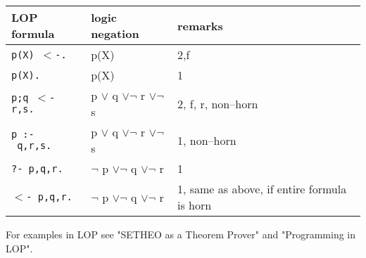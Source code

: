\begin{center}
\begin{tabular}{|l|l|l|}
\hline
LOP formula & logic negation & remarks \\
\hline
\hline
{\tt p(X) $<$-.} & p(X) & 2,f \\
\hline
{\tt p(X).} & p(X) & 1 \\
\hline
{\tt p;q $<$- r,s.} &
 p $\vee$ q $\vee \neg$ r $\vee \neg$ s 
& 2, f, r, non--horn \\
\hline
{\tt p :- ~q,r,s.} & p $\vee$ q $\vee \neg$ r $\vee \neg$ s &
1, non--horn \\ 
\hline
{\tt ?- p,q,r.} &
 $\neg$ p $\vee \neg$ q $\vee \neg$ r 
& 1 \\
\hline
{\tt $<$- p,q,r.} &
 $\neg$ p $\vee \neg$ q $\vee \neg$ r 
& 1, same as above, if entire formula is horn \\
\hline
\end{tabular}
\end{center}
\vspace{8mm}

For examples in LOP see "SETHEO as a Theorem Prover" and "Programming in LOP".


                
